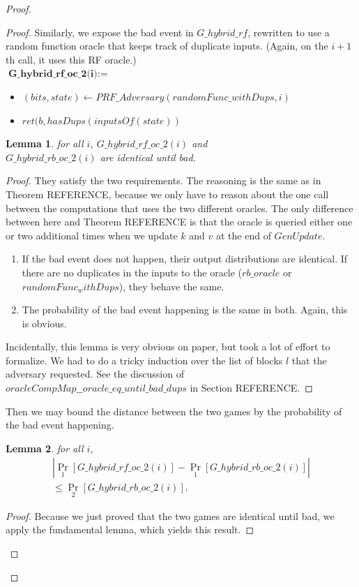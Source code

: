 \documentclass[12pt,lot, lof]{puthesis}
\newenvironment{game}
{ \begin{itemize}[noitemsep,nolistsep] 
}
{ \end{itemize}                  }
\newcommand{\lar}{\leftarrow}
\newtheorem{lem}{Lemma}[thm]
\begin{document}
\begin{proof}
\begin{proof}
Similarly, we expose the bad event in $G\_hybrid\_rf$, rewritten to use a random function oracle that keeps track of duplicate inputs. (Again, on the $i+1$th call, it uses this RF oracle.)\\

$\textbf{G\_hybrid\_rf\_oc\_2(i)} := $
\begin{game}
\item[] $(bits, state) \lar PRF\_Adversary (randomFunc\_withDups, i)$
\item[] $ret(b, hasDups(inputsOf(state))$ 
\end{game} 

\begin{lem} for all $i$,
$G\_hybrid\_rf\_oc\_2(i)$ and \\
  $G\_hybrid\_rb\_oc\_2(i)$ are identical until bad. \end{lem}
\begin{proof} 
They satisfy the two requirements. The reasoning is the same as in Theorem REFERENCE, because we only have to reason about the one call between the computations that uses the two different oracles. The only difference between here and Theorem REFERENCE is that the oracle is queried either one or two additional times when we update $k$ and $v$ at the end of $GenUpdate$.

  \begin{enumerate}
  \item If the bad event does not happen, their output distributions are identical. If there are no duplicates in the inputs to the oracle ($rb\_oracle$ or $randomFunc_withDups$), they behave the same.
  \item The probability of the bad event happening is the same in both. Again, this is obvious.
  \end{enumerate}

Incidentally, this lemma is very obvious on paper, but took a lot of effort to formalize. We had to do a tricky induction over the list of blocks $l$ that the adversary requested. See the discussion of $oracleCompMap\_\_oracle\_eq\_until\_bad\_dups$ in Section REFERENCE.
\end{proof}

Then we may bound the distance between the two games by the probability of the bad event happening.

\begin{lem} for all $i$,
\begin{gather*}
|\Pr_1[G\_hybrid\_rf\_oc\_2(i)] - \Pr_1[G\_hybrid\_rb\_oc\_2(i)] |
\\ \leq \Pr_2[G\_hybrid\_rb\_oc\_2(i)].
\end{gather*}
\end{lem}
\begin{proof}
Because we just proved that the two games are identical until bad, we apply the fundamental lemma, which yields this result. 
\end{proof}


\end{proof}
\end{proof}
\end{document}

